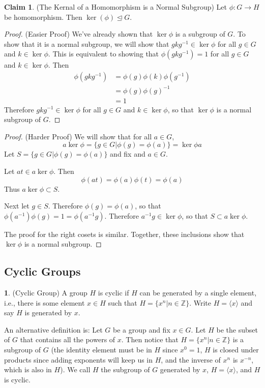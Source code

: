 \documentclass[12pt]{article}
\theoremstyle{definition}
\newtheorem{definition}{\color{NavyBlue}{\textbf{Definition}}}
\newtheorem{claim}{\color{JungleGreen}Claim}
\theoremstyle{definition}
\begin{document}
\begin{claim}(The Kernal of a Homomorphism is a Normal Subgroup)
Let $\phi : G \to H$ be homomorphism. Then $\ker (\phi) \trianglelefteq G$.
\end{claim}
\begin{proof}(Easier Proof)
We've already shown that $\ker \phi$ is a subgroup of $G$. To show that it is a normal subgroup, we will show that $g k g^{-1} \in \ker \phi$ for all $g \in G$ and $k \in \ker \phi$. This is equivalent to showing that $\phi(g k g^{-1}) = 1$ for all $g \in G$ and $k \in \ker \phi$. Then
\begin{align*}
	\phi(g k g^{-1}) &= \phi(g)\phi(k)\phi(g^{-1}) \\
	&= \phi(g) \phi(g)^{-1} \\
	&= 1
\end{align*}
Therefore $g k g^{-1} \in \ker \phi$ for all $g \in G$ and $k \in \ker \phi$, so that $\ker \phi$ is a normal subgroup of $G$. 
\end{proof}

\begin{proof}(Harder Proof)
We will show that for all $a \in G$, 
\begin{equation}
	a \ker\phi = \{g \in G | \phi(g) = \phi(a) \} = \ker \phi a
\end{equation}
Let $S = \{g \in G | \phi(g) = \phi(a) \}$ and fix and $a \in G$. 

Let $at \in a \ker \phi$. Then 
\begin{equation}
	\phi(at) = \phi(a)\phi(t) = \phi(a)
\end{equation}
Thus $a \ker \phi \subset S$. 

Next let $g \in S$. Therefore $\phi(g) = \phi(a)$, so that $\phi(a^{-1}) \phi(g) = 1 = \phi(a^{-1}g)$. Therefore $a^{-1}g \in \ker \phi$, so that $S \subset a \ker\phi$. 

The proof for the right cosets is similar. Together, these inclusions show that $\ker \phi$ is a normal subgroup. 
\end{proof}

\subsection{Cyclic Groups}
\begin{definition}(Cyclic Group)
A group $H$ is cyclic if $H$ can be generated by a single element, i.e., there is some element $x \in H$ such that $H = \{x^n | n \in \mathbb{Z} \}$. Write $H  = \langle x \rangle$ and say $H$ is generated by $x$.

An alternative definition is: Let $G$ be a group and fix $x \in G$. Let $H$ be the subset of $G$ that contains all the powers of $x$. Then notice that $H = \{x^n | n \in \mathbb{Z} \}$ is a subgroup of $G$ (the identity element must be in $H$ since $x^0 = 1$, $H$ is closed under products since adding exponents will keep us in $H$, and the inverse of $x^n$ is $x^{-n}$, which is also in $H$). We call $H$ the subgroup of $G$ generated by $x$, $H = \langle x \rangle$, and $H$ is cyclic.  
\end{definition}
\end{document}
